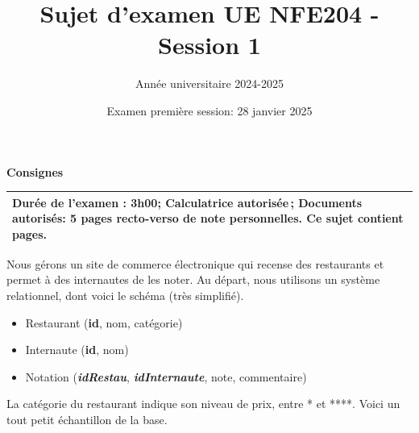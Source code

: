 \documentclass[10pt,a4paper]{article}
\begin{document}
\title{Sujet d'examen UE NFE204 - Session 1}
\author{Année universitaire 2024-2025}
\date{Examen première session:  28 janvier 2025}

\maketitle

\begin{center}
{\bf \Large Consignes}\\
\begin{tabular}{| p{15cm} |}
\hline
Dur\'ee de l'examen : 3h00; Calculatrice autoris\'ee\,; Documents autorisés: 5 pages recto-verso de note personnelles.
Ce sujet contient \pageref{LastPage} pages.\\
\hline
\end{tabular}
\end{center}


Nous gérons un site de commerce électronique qui recense des restaurants
et permet à des internautes de les noter. Au départ,  nous utilisons
un système relationnel, dont voici le schéma (très simplifié).

\begin{itemize}
  \item Restaurant   (\textbf{id}, nom, catégorie)
  \item Internaute (\textbf{id}, nom)
  \item Notation (\textbf{\textit{idRestau}}, \textbf{\textit{idInternaute}}, note, commentaire)
\end{itemize}

\vspace*{0.2cm}

La catégorie du restaurant indique son niveau de prix, entre * et ****. 
Voici  un tout petit échantillon de la base.
\end{document}

